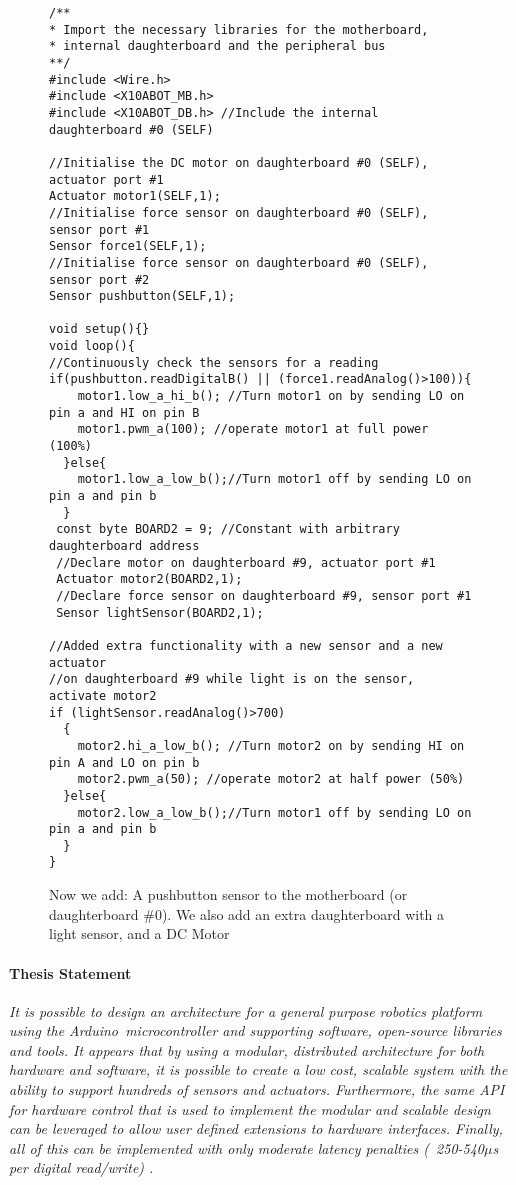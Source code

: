 \begin{figure}
		\footnotesize
		\begin{verbatim}
        \end{verbatim}
        \begin{verbatim}
/**
* Import the necessary libraries for the motherboard, 
* internal daughterboard and the peripheral bus
**/
#include <Wire.h>  
#include <X10ABOT_MB.h>
#include <X10ABOT_DB.h> //Include the internal daughterboard #0 (SELF)

//Initialise the DC motor on daughterboard #0 (SELF), actuator port #1
Actuator motor1(SELF,1);
//Initialise force sensor on daughterboard #0 (SELF), sensor port #1
Sensor force1(SELF,1);
//Initialise force sensor on daughterboard #0 (SELF), sensor port #2
Sensor pushbutton(SELF,1);
   
void setup(){}
void loop(){
//Continuously check the sensors for a reading
if(pushbutton.readDigitalB() || (force1.readAnalog()>100)){
    motor1.low_a_hi_b(); //Turn motor1 on by sending LO on pin a and HI on pin B
    motor1.pwm_a(100); //operate motor1 at full power (100%) 
  }else{
    motor1.low_a_low_b();//Turn motor1 off by sending LO on pin a and pin b
  }
 const byte BOARD2 = 9; //Constant with arbitrary daughterboard address
 //Declare motor on daughterboard #9, actuator port #1
 Actuator motor2(BOARD2,1);
 //Declare force sensor on daughterboard #9, sensor port #1
 Sensor lightSensor(BOARD2,1);
 
//Added extra functionality with a new sensor and a new actuator
//on daughterboard #9 while light is on the sensor, activate motor2
if (lightSensor.readAnalog()>700)
  {
    motor2.hi_a_low_b(); //Turn motor2 on by sending HI on pin A and LO on pin b
    motor2.pwm_a(50); //operate motor2 at half power (50%)
  }else{
    motor2.low_a_low_b();//Turn motor1 off by sending LO on pin a and pin b
  }
}	 
	\end{verbatim}
		\caption{Now we add: A pushbutton sensor to the motherboard (or daughterboard \#0). We also add an extra daughterboard with a light sensor, and a DC Motor} \label{code:simplplus}
    
\end{figure}

\paragraph*{Thesis Statement}
\textit{It is possible to design an architecture for a general purpose robotics platform using the Arduino\texttrademark\ microcontroller and supporting software, open-source libraries and tools. It appears that by using a modular, distributed architecture for both hardware and software, it is possible to create a low cost, scalable system with the ability to support hundreds of sensors and actuators. Furthermore, the same API for hardware control that is used to implement the modular and scalable design can be leveraged to allow user defined extensions to hardware interfaces. Finally, all of this can be implemented with only moderate latency penalties (~250-540$\mu$s per digital read/write) .} 


